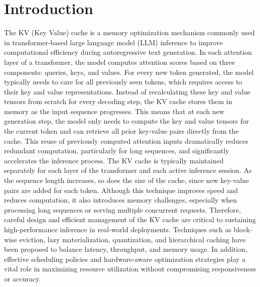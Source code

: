 \documentclass[sigconf,nonacm]{acmart}
\begin{document}
\section{Introduction}
The KV (Key Value) cache is a memory optimization mechanism commonly used in transformer-based large language model (LLM) inference to improve computational efficiency during autoregressive text generation. In each attention layer of a transformer, the model computes attention scores based on three components: queries, keys, and values. For every new token generated, the model typically needs to care for all previously seen tokens, which requires access to their key and value representations. Instead of recalculating these key and value tensors from scratch for every decoding step, the KV cache stores them in memory as the input sequence progresses. This means that at each new generation step, the model only needs to compute the key and value tensors for the current token and can retrieve all prior key-value pairs directly from the cache. This reuse of previously computed attention inputs dramatically reduces redundant computation, particularly for long sequences, and significantly accelerates the inference process. The KV cache is typically maintained separately for each layer of the transformer and each active inference session. As the sequence length increases, so does the size of the cache, since new key-value pairs are added for each token. Although this technique improves speed and reduces computation, it also introduces memory challenges, especially when processing long sequences or serving multiple concurrent requests. Therefore, careful design and efficient management of the KV cache are critical to sustaining high-performance inference in real-world deployments. Techniques such as block-wise eviction, lazy materialization, quantization, and hierarchical caching have been proposed to balance latency, throughput, and memory usage. In addition, effective scheduling policies and hardware-aware optimization strategies play a vital role in maximizing resource utilization without compromising responsiveness or accuracy.
\end{document}
